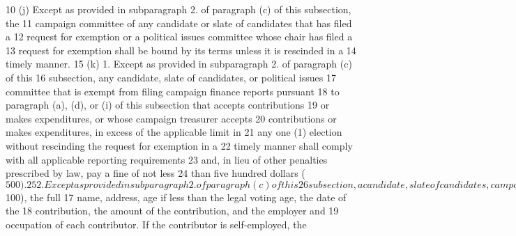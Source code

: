 10 (j) Except as provided in subparagraph 2. of paragraph (c) of this subsection, the
11 campaign committee of any candidate or slate of candidates that has filed a
12 request for exemption or a political issues committee whose chair has filed a
13 request for exemption shall be bound by its terms unless it is rescinded in a
14 timely manner.
15 (k) 1. Except as provided in subparagraph 2. of paragraph (c) of this
16 subsection, any candidate, slate of candidates, or political issues
17 committee that is exempt from filing campaign finance reports pursuant
18 to paragraph (a), (d), or (i) of this subsection that accepts contributions
19 or makes expenditures, or whose campaign treasurer accepts
20 contributions or makes expenditures, in excess of the applicable limit in
21 any one (1) election without rescinding the request for exemption in a
22 timely manner shall comply with all applicable reporting requirements
23 and, in lieu of other penalties prescribed by law, pay a fine of not less
24 than five hundred dollars ($500).
25 2. Except as provided in subparagraph 2. of paragraph (c) of this
26 subsection, a candidate, slate of candidates, campaign committee, or
27 political issues committee that is exempt from filing campaign finance 
UNOFFICIAL COPY 21 RS BR 1691
Page 57 of 68
XXXX Jacketed
1 reports pursuant to paragraph (a), (d), or (i) of this subsection that
2 knowingly accepts contributions or makes expenditures in excess of the
3 applicable spending limit in any one (1) election without rescinding the
4 request for exemption in a timely manner shall comply with all
5 applicable reporting requirements and shall be guilty of a Class D
6 felony.
7 (2) (a) State and county executive committees, and caucus campaign committees
8 shall make a full report, upon a prescribed form, to the registry, of all money,
9 loans, or other things of value, received from any source, and expenditures
10 authorized, incurred, or made, since the date of the last report, including:
11 1. For each contribution of any amount made by a permanent committee,
12 the name and business address of the permanent committee, the date of
13 the contribution, the amount contributed, and a description of the major
14 business, social, or political interest represented by the permanent
15 committee;
16 2. For other contributions in excess of one hundred dollars ($100), the full
17 name, address, age if less than the legal voting age, the date of the
18 contribution, the amount of the contribution, and the employer and
19 occupation of each contributor. If the contributor is self-employed, the
